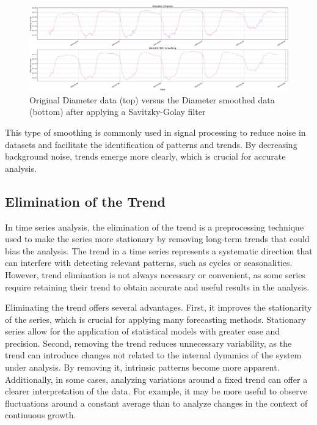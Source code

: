 \begin{figure}[htbp]
    \centering
    \includegraphics[width=15 cm]{5_ChapterDesign/figuras/2_Smoothing/Smoothing_Diameter}
    \caption{Original Diameter data (top) versus the Diameter smoothed data (bottom) after applying a Savitzky-Golay filter}
\end{figure}

This type of smoothing is commonly used in signal processing to reduce noise in datasets and facilitate the identification of patterns and trends. By decreasing background noise, trends emerge more clearly, which is crucial for accurate analysis.

\subsection{Elimination of the Trend}

In time series analysis, the elimination of the trend is a preprocessing technique used to make the series more stationary by removing long-term trends that could bias the analysis. The trend in a time series represents a systematic direction that can interfere with detecting relevant patterns, such as cycles or seasonalities. However, trend elimination is not always necessary or convenient, as some series require retaining their trend to obtain accurate and useful results in the analysis.

Eliminating the trend offers several advantages. First, it improves the stationarity of the series, which is crucial for applying many forecasting methods. Stationary series allow for the application of statistical models with greater ease and precision. Second, removing the trend reduces unnecessary variability, as the trend can introduce changes not related to the internal dynamics of the system under analysis. By removing it, intrinsic patterns become more apparent. Additionally, in some cases, analyzing variations around a fixed trend can offer a clearer interpretation of the data. For example, it may be more useful to observe fluctuations around a constant average than to analyze changes in the context of continuous growth.

